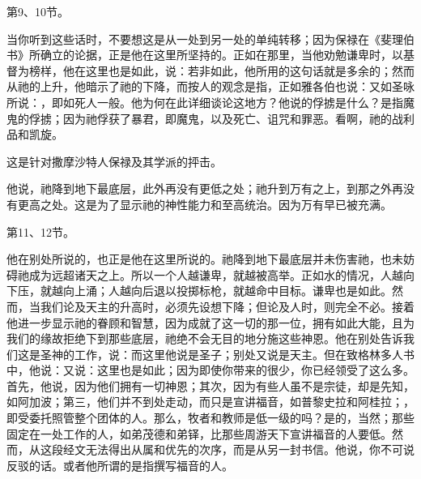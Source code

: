 第9、10节。\par

当你听到这些话时，不要想这是从一处到另一处的单纯转移；因为保禄在《斐理伯书》所确立的论据，正是他在这里所坚持的。正如在那里，当他劝勉谦卑时，以基督为榜样，他在这里也是如此，说：若非如此，他所用的这句话就是多余的；然而从祂的上升，他暗示了祂的下降，而按人的观念是指，正如雅各伯也说：又如圣咏所说：，即如死人一般。他为何在此详细谈论这地方？他说的俘掳是什么？是指魔鬼的俘掳；因为祂俘获了暴君，即魔鬼，以及死亡、诅咒和罪恶。看啊，祂的战利品和凯旋。\par

\par

这是针对撒摩沙特人保禄及其学派的抨击。\par

\par

他说，祂降到地下最底层，此外再没有更低之处；祂升到万有之上，到那之外再没有更高之处。这是为了显示祂的神性能力和至高统治。因为万有早已被充满。\par

第11、12节。\par

他在别处所说的，也正是他在这里所说的。祂降到地下最底层并未伤害祂，也未妨碍祂成为远超诸天之上。所以一个人越谦卑，就越被高举。正如水的情况，人越向下压，就越向上涌；人越向后退以投掷标枪，就越命中目标。谦卑也是如此。然而，当我们论及天主的升高时，必须先设想下降；但论及人时，则完全不必。接着他进一步显示祂的眷顾和智慧，因为成就了这一切的那一位，拥有如此大能，且为我们的缘故拒绝下到那些底层，祂绝不会无目的地分施这些神恩。他在别处告诉我们这是圣神的工作，说：而这里他说是圣子；别处又说是天主。但在致格林多人书中，他说：又说：这里也是如此；因为即使你带来的很少，你已经领受了这么多。首先，他说，因为他们拥有一切神恩；其次，因为有些人虽不是宗徒，却是先知，如阿加波；第三，他们并不到处走动，而只是宣讲福音，如普黎史拉和阿桂拉；，即受委托照管整个团体的人。那么，牧者和教师是低一级的吗？是的，当然；那些固定在一处工作的人，如弟茂德和弟铎，比那些周游天下宣讲福音的人要低。然而，从这段经文无法得出从属和优先的次序，而是从另一封书信。他说，你不可说反驳的话。或者他所谓的是指撰写福音的人。\par

